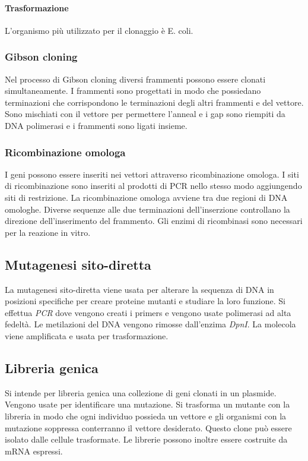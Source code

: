 			\paragraph{Trasformazione}
			L'organismo pi\`u utilizzato per il clonaggio \`e E. coli.

		\subsubsection{Gibson cloning}
		Nel processo di Gibson cloning diversi frammenti possono essere clonati simultaneamente.
		I frammenti sono progettati in modo che possiedano terminazioni che corrispondono le terminazioni degli altri frammenti e del vettore.
		Sono mischiati con il vettore per permettere l'anneal e i gap sono riempiti da DNA polimerasi e i frammenti sono ligati insieme.

		\subsubsection{Ricombinazione omologa}
		I geni possono essere inseriti nei vettori attraverso ricombinazione omologa.
		I siti di ricombinazione sono inseriti al prodotti di PCR nello stesso modo aggiungendo siti di restrizione.
		La ricombinazione omologa avviene tra due regioni di DNA omologhe.
		Diverse sequenze alle due terminazioni dell'inserzione controllano la direzione dell'inserimento del frammento.
		Gli enzimi di ricombinasi sono necessari per la reazione in vitro.

	\subsection{Mutagenesi sito-diretta}
	La mutagenesi sito-diretta viene usata per alterare la sequenza di DNA in posizioni specifiche per creare proteine mutanti e studiare la loro funzione.
	Si effettua \emph{PCR} dove vengono creati i primers e vengono usate polimerasi ad alta fedelt\`a.
	Le metilazioni del DNA vengono rimosse dall'enzima \emph{DpnI}.
	La molecola viene amplificata e usata per trasformazione.

	\subsection{Libreria genica}
	Si intende per libreria genica una collezione di geni clonati in un plasmide.
	Vengono usate per identificare una mutazione.
	Si trasforma un mutante con la libreria in modo che ogni individuo possieda un vettore e gli organismi con la mutazione soppressa conterranno il vettore desiderato.
	Questo clone pu\`o essere isolato dalle cellule trasformate.
	Le librerie possono inoltre essere costruite da mRNA espressi.

